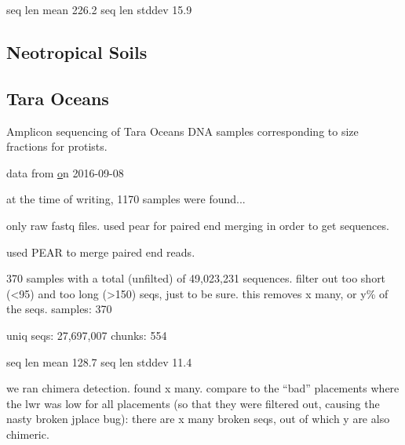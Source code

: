 seq len mean 226.2
seq len stddev 15.9


\subsection{Neotropical Soils}
\label{sec:MetagenomicDatasets:sub:NeotropicalSoils}


\subsection{Tara Oceans}
\label{sec:MetagenomicDatasets:sub:TaraOceans}


Amplicon sequencing of Tara Oceans DNA samples corresponding to size fractions for protists.

data from \href{https://www.ebi.ac.uk/ena/data/view/PRJEB6610}
on 2016-09-08

at the time of writing, 1170 samples were found...



only raw fastq files. used pear for paired end merging in order to get sequences.

used PEAR \cite{Zhang2014} to merge paired end reads.

370 samples with a total (unfilted) of 49,023,231 sequences.
filter out too short (<95) and too long (>150) seqs, just to be sure.
this removes x many, or y\% of the seqs.
samples: 370

uniq seqs: 27,697,007
chunks: 554

seq len mean 128.7
seq len stddev 11.4

we ran chimera detection. found x many.
compare to the ``bad'' placements where the lwr was low for all placements
(so that they were filtered out, causing the nasty broken jplace bug):
there are x many broken seqs, out of which y are also chimeric.

